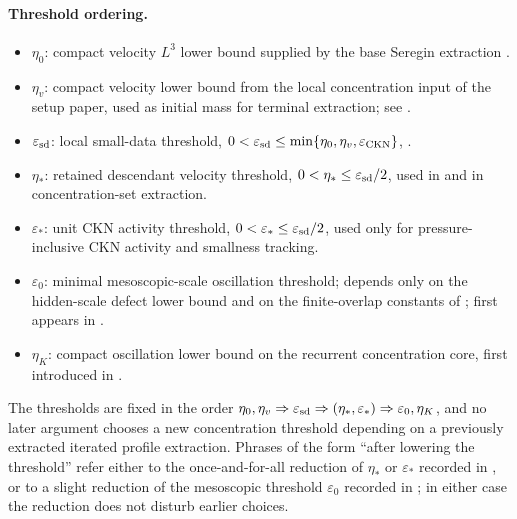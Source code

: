 \documentclass[11pt]{amsart}
\numberwithin{equation}{section}
\theoremstyle{plain}
\theoremstyle{definition}
\theoremstyle{remark}
\newcommand{\eps}{\varepsilon}
\newcommand{\CKN}{\mathrm{CKN}}
\begin{document}
\paragraph{Threshold ordering.}
\begin{itemize}[leftmargin=1.6em]
   \item \(\eta_0\): compact velocity \(L^3\) lower bound supplied by the base
      Seregin extraction .
   \item \(\eta_v\): compact velocity lower bound from the local concentration
      input of the setup paper, used as initial mass for terminal extraction;
      see .
   \item \(\eps_{\rm sd}\): local small-data threshold,
      \(0<\eps_{\rm sd}\le\min\{\eta_0,\eta_v,\eps_{\CKN}\}\),
      .
   \item \(\eta_*\): retained descendant velocity threshold,
      \(0<\eta_*\le\eps_{\rm sd}/2\), used in
       and in concentration-set extraction.
   \item \(\eps_*\): unit CKN activity threshold,
      \(0<\eps_*\le\eps_{\rm sd}/2\), used only for pressure-inclusive
      CKN activity and smallness tracking.
   \item \(\eps_0\): minimal mesoscopic-scale oscillation threshold; depends
      only on the hidden-scale defect lower bound and on the finite-overlap
      constants of ; first appears
      in .
   \item \(\eta_K\): compact oscillation lower bound on the recurrent concentration core,
      first introduced in .
\end{itemize}
The thresholds are fixed in the order
\(\eta_0,\eta_v\Rightarrow\eps_{\rm sd}\Rightarrow(\eta_*,\eps_*)\Rightarrow\eps_0,
\eta_K\), and no later argument chooses a new concentration threshold depending
on a previously extracted iterated profile extraction.  Phrases of the form ``after lowering
the threshold'' refer either to the once-and-for-all reduction of \(\eta_*\)
or \(\eps_*\) recorded in , or to a slight
reduction of the mesoscopic threshold \(\eps_0\) recorded in
; in either case the reduction does not
disturb earlier choices.
\end{document}
